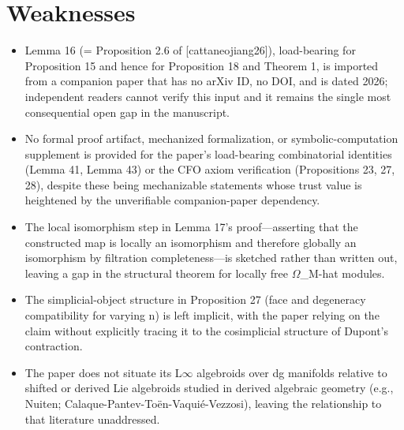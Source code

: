 \documentclass[11pt]{article}
\begin{document}
\section*{Weaknesses}
\begin{itemize}[leftmargin=*]
  \item Lemma 16 (= Proposition 2.6 of [cattaneojiang26]), load-bearing for Proposition 15 and hence for Proposition 18 and Theorem 1, is imported from a companion paper that has no arXiv ID, no DOI, and is dated 2026; independent readers cannot verify this input and it remains the single most consequential open gap in the manuscript.
  \item No formal proof artifact, mechanized formalization, or symbolic-computation supplement is provided for the paper's load-bearing combinatorial identities (Lemma 41, Lemma 43) or the CFO axiom verification (Propositions 23, 27, 28), despite these being mechanizable statements whose trust value is heightened by the unverifiable companion-paper dependency.
  \item The local isomorphism step in Lemma 17's proof---asserting that the constructed map is locally an isomorphism and therefore globally an isomorphism by filtration completeness---is sketched rather than written out, leaving a gap in the structural theorem for locally free \ensuremath{\Omega}\_M-hat modules.
  \item The simplicial-object structure in Proposition 27 (face and degeneracy compatibility for varying n) is left implicit, with the paper relying on the claim without explicitly tracing it to the cosimplicial structure of Dupont's contraction.
  \item The paper does not situate its L\ensuremath{\infty} algebroids over dg manifolds relative to shifted or derived Lie algebroids studied in derived algebraic geometry (e.g., Nuiten; Calaque-Pantev-Toën-Vaquié-Vezzosi), leaving the relationship to that literature unaddressed.
\end{itemize}
\end{document}
